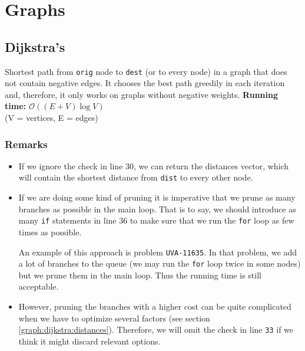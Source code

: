 \chapter{Graphs}

\section{Dijkstra's}
Shortest path from \texttt{orig} node to \texttt{dest} (or to every node) in a graph
that does not contain negative edges. 
It chooses the best path greedily in each iteration and, therefore, it only works
on graphs without negative weights. 
\noindent \textbf{\boldmath Running time: $\mathcal{O}((E+V)\log V)$}
\\ {\small(V = vertices, E = edges)}
\subsection*{Remarks}
\begin{itemize}
	\item If we ignore the check in line 30, we can return the distances 
		vector, which will contain the shortest distance from \texttt{dist}
		to every other node.
	\item If we are doing some kind of pruning it is imperative that we prune 
	as many branches as possible in the main loop. That is to say, we should
	introduce as many \texttt{if} statements in line 36 to make sure that we
	run the \texttt{for} loop as few times as possible. 

	An example of this approach is problem \texttt{UVA-11635}. In that problem, we
	add a lot of branches to the queue (we may run the \texttt{for} loop
	twice in some nodes) but we prune them in the main loop. Thus the 
	running time is still acceptable.

\item  However, pruning the branches with a higher cost can be quite complicated 
	when we have to optimize several factors (see section \ref{graph:dijkstra:distances}).
	Therefore, we will omit the check in line \texttt{33} if we think it might discard 
	relevant options.

\end{itemize}

\newpage
